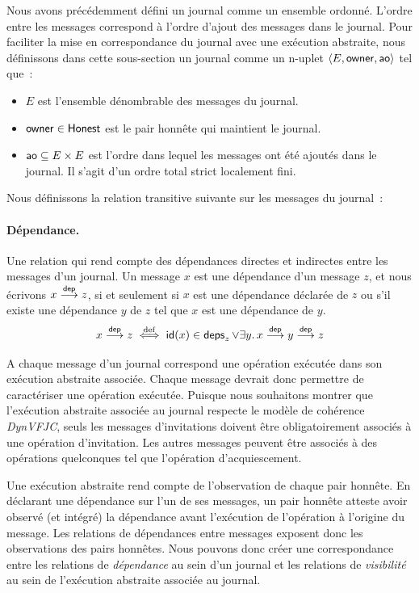 Nous avons précédemment défini un journal comme un ensemble ordonné.
L'ordre entre les messages correspond à l'ordre d'ajout des messages dans le journal.
Pour faciliter la mise en correspondance du journal avec une exécution abstraite, nous définissons dans cette sous-section un journal comme un n-uplet $\tuple*{E, \trm{owner}, \trm{ao}}$ tel que~:
\begin{itemize}
    \item $E$ est l'ensemble dénombrable des messages du journal.
    \item $\trm{owner} \in \trm{Honest}$ est le pair honnête qui maintient le journal.
    \item $\trm{ao} \subseteq E \times E$ est l'ordre dans lequel les messages ont été ajoutés dans le journal.
    Il s'agit d'un ordre total strict localement fini.
\end{itemize}

Nous définissons la relation transitive suivante sur les messages du journal~:

\paragraph{Dépendance.} Une relation qui rend compte des dépendances directes et indirectes entre les messages d'un journal.
Un message $x$ est une dépendance d'un message $z$, et nous écrivons $x \dep z$, si et seulement si $x$ est une dépendance déclarée de $z$ ou s'il existe une dépendance $y$ de $z$ tel que $x$ est une dépendance de $y$.
\begin{equation*}
    x \dep z \defiff \trm{id}(x) \in \trm{deps}_z \lor \exists y \qsep x \dep y \dep z
\end{equation*}

A chaque message d'un journal correspond une opération exécutée dans son exécution abstraite associée.
Chaque message devrait donc permettre de caractériser une opération exécutée.
Puisque nous souhaitons montrer que l'exécution abstraite associée au journal respecte le modèle de cohérence \emph{DynVFJC}, seuls les messages d'invitations doivent être obligatoirement associés à une opération d'invitation.
Les autres messages peuvent être associés à des opérations quelconques tel que l'opération d'acquiescement.

Une exécution abstraite rend compte de l'observation de chaque pair honnête.
En déclarant une dépendance sur l'un de ses messages, un pair honnête atteste avoir observé (et intégré) la dépendance avant l'exécution de l'opération à l'origine du message.
Les relations de dépendances entre messages exposent donc les observations des pairs honnêtes.
Nous pouvons donc créer une correspondance entre les relations de \emph{dépendance} au sein d'un journal et les relations de \emph{visibilité} au sein de l'exécution abstraite associée au journal.

